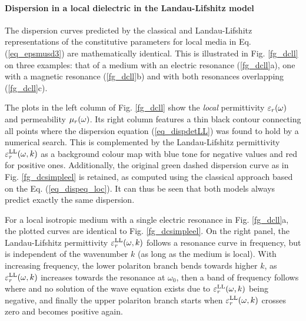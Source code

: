 \paragraph{Dispersion in a local dielectric in the Landau-Lifshitz model} %
The dispersion curves predicted by the classical and Landau-Lifshitz representations of the constitutive parameters for local media in Eq. (\ref{eq_epsmusd3}) are mathematically identical. This is illustrated in Fig. \ref{fg_dcll} on three examples: that of a medium with an electric resonance (\ref{fg_dcll}a), one with  a magnetic resonance (\ref{fg_dcll}b) and  with both resonances overlapping (\ref{fg_dcll}c). 

The plots in the left column of Fig. \ref{fg_dcll} show the \textit{local} permittivity $\varepsilon_r(\omega)$ and permeability $\mu_r(\omega)$.
Its right column features a thin black contour connecting all points where the dispersion equation (\ref{eq_dispdetLL}) was found to hold by a numerical search.
This is complemented by the Landau-Lifshitz permittivity $\varepsilon_r^\text{LL}(\omega, k)$ as a background colour map with blue tone for negative values and red for positive ones. 
Additionally, the original green dashed dispersion curve as in Fig. \ref{fg_dcsimpleel} is retained, as computed using the classical approach based on the Eq. (\ref{eq_dispeq_loc}). It can thus be seen that both models always predict exactly the same dispersion.

For a local isotropic medium with a single electric resonance in Fig. \ref{fg_dcll}a, the plotted curves are identical to Fig. \ref{fg_dcsimpleel}. On the right panel, the Landau-Lifshitz permittivity $\varepsilon_r^\text{LL}(\omega, k)$ follows a resonance curve in frequency, but is independent of the wavenumber $k$ (as long as the medium is local). With increasing frequency, the lower polariton branch bends towards higher $k$, as $\varepsilon_r^\text{LL}(\omega, k)$ increases towards the resonance at $\omega_0$, then a band of frequency follows where and no solution of the wave equation %
exists due to $\varepsilon_r^\text{LL}(\omega, k)$ being negative, and finally the upper polariton branch starts when $\varepsilon_r^\text{LL}(\omega, k)$ crosses zero and becomes positive again.


